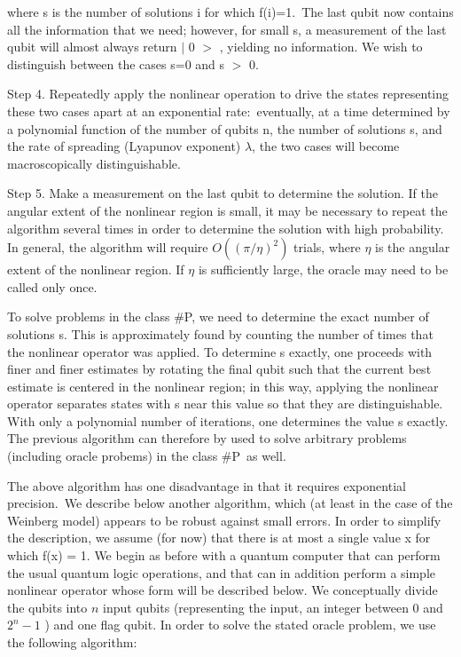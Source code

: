 \documentclass{article}
\begin{document}
where s is the number of solutions i for which f(i)=1.\ The last qubit now
contains all the information that we need; however, for small s, a measurement
of the last qubit will almost always return
$\vert$%
0%
$>$%
, yielding no information. We wish to distinguish between the cases s=0 and s%
$>$%
0.

Step 4. Repeatedly apply the nonlinear operation to drive the states
representing these two cases apart at an exponential rate:\ eventually, at a
time determined by a polynomial function of the number of qubits n, the number
of solutions s, and the rate of spreading (Lyapunov exponent) $\lambda$, the
two cases will become macroscopically distinguishable.

Step 5. Make a measurement on the last qubit to determine the solution. If the
angular extent of the nonlinear region is small, it may be necessary to repeat
the algorithm several times in order to determine the solution with high
probability. In general, the algorithm will require $O((\pi/\eta)^{2})$
trials, where $\eta$ is the angular extent of the nonlinear region. If $\eta$
is sufficiently large, the oracle may need to be called only once.

To solve problems in the class \#P, we need to determine the exact number of
solutions s. This is approximately found by counting the number of times that
the nonlinear operator was applied. To determine s exactly, one proceeds with
finer and finer estimates by rotating the final qubit such that the current
best estimate is centered in the nonlinear region; in this way, applying the
nonlinear operator separates states with s near this value so that they are
distinguishable. With only a polynomial number of iterations, one determines
the value s exactly. The previous algorithm can therefore by used to solve
arbitrary problems (including oracle probems) in the class \#P\ as well.

The above algorithm has one disadvantage in that it requires exponential
precision.\ We describe below another algorithm, which (at least in the case
of the Weinberg model) appears to be robust against small errors. In order to
simplify the description, we assume (for now) that there is at most a single
value x for which f(x) = 1. We begin as before with a quantum computer that
can perform the usual quantum logic operations, and that can in addition
perform a simple nonlinear operator whose form will be described below. We
conceptually divide the qubits into $n$ input qubits (representing the input,
an integer between 0 and $2^{n}-1$ ) and one flag qubit. In order to solve the
stated oracle problem, we use the following algorithm:
\end{document}
